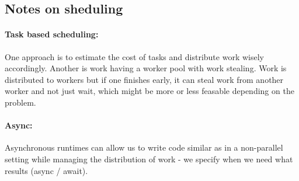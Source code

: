 \subsection{Notes on sheduling}

\paragraph*{Task based scheduling:} One approach is to estimate the cost of tasks and distribute work wisely accordingly.
Another is work having a worker pool with work stealing. Work is distributed to workers
but if one finishes early, it can steal work from another worker and not just wait,
which might be more or less feasable depending on the problem.

\paragraph*{Async:} Asynchronous runtimes can allow us to write code similar as in a non-parallel setting 
while managing the distribution of work - we specify
when we need what results (async / await).


